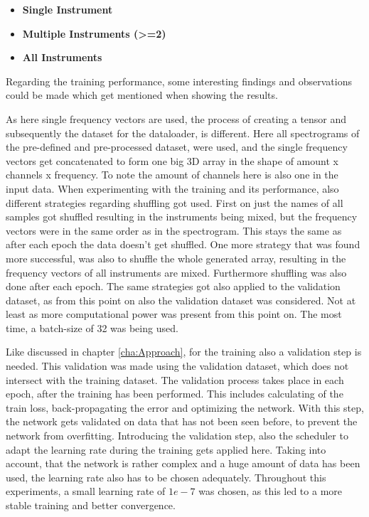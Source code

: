 \begin{itemize}
    \item \textbf{Single Instrument}
    \item \textbf{Multiple Instruments (>=2)}
    \item \textbf{All Instruments}
\end{itemize}

Regarding the training performance, some interesting findings and observations could be made which get mentioned when showing the results. 

As here single frequency vectors are used, the process of creating a tensor and subsequently the dataset for the dataloader, is different. Here all spectrograms of the pre-defined and pre-processed dataset, were used, and the single frequency vectors get concatenated to form one big 3D array in the shape of amount x channels x frequency. To note the amount of channels here is also one in the input data. When experimenting with the training and its performance, also different strategies regarding shuffling got used. First on just the names of all samples got shuffled resulting in the instruments being mixed, but the frequency vectors were in the same order as in the spectrogram. This stays the same as after each epoch the data doesn't get shuffled. One more strategy that was found more successful, was also to shuffle the whole generated array, resulting in the frequency vectors of all instruments are mixed. Furthermore shuffling was also done after each epoch. The same strategies got also applied to the validation dataset, as from this point on also the validation dataset was considered. Not at least as more computational power was present from this point on. The most time, a batch-size of 32 was being used. 

Like discussed in chapter \ref{cha:Approach}, for the training also a validation step is needed. This validation was made using the validation dataset, which does not intersect with the training dataset. The validation process takes place in each epoch, after the training has been performed. This includes calculating of the train loss, back-propagating the error and optimizing the network. With this step, the network gets validated on data that has not been seen before, to prevent the network from overfitting. Introducing the validation step, also the scheduler to adapt the learning rate during the training gets applied here. Taking into account, that the network is rather complex and a huge amount of data has been used, the learning rate also has to be chosen adequately. Throughout this experiments, a small learning rate of $1e-7$ was chosen, as this led to a more stable training and better convergence. 

